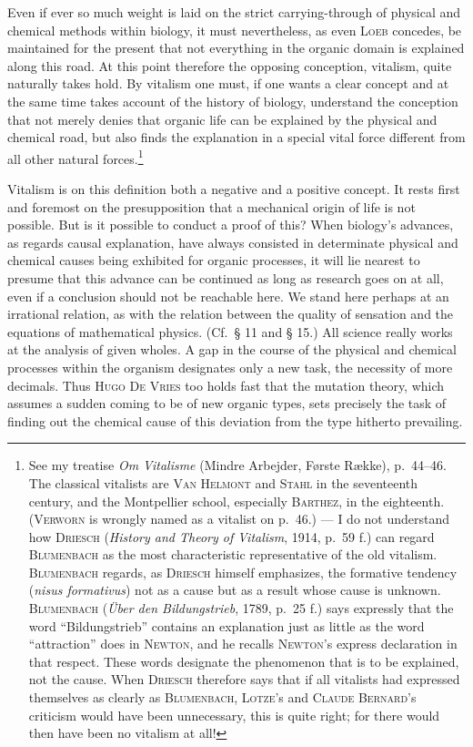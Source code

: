 \documentclass[12pt]{book}
\newcommand{\opage}[1]{\marginnote{\footnotesize\textit{[#1]}}}
\begin{document}
\opage{53}Even if ever so much weight is laid on the strict carrying-through of physical and
chemical methods within biology, it must nevertheless, as even \textsc{Loeb} concedes,
be maintained for the present that not everything in the organic domain is explained
along this road. At this point therefore the opposing conception, vitalism, quite
naturally takes hold. By vitalism one must, if one wants a clear concept and at the
same time takes account of the history of biology, understand the conception that not
merely denies that organic life can be explained by the physical and chemical road,
but also finds the explanation in a special vital force different from all other
natural forces.\footnote{See my treatise \textit{Om Vitalisme} (Mindre Arbejder,
Første Række), p.\ 44--46. The classical vitalists are \textsc{Van Helmont} and
\textsc{Stahl} in the seventeenth century, and the Montpellier school, especially
\textsc{Barthez}, in the eighteenth. (\textsc{Verworn} is wrongly named as a vitalist
on p.\ 46.) --- I do not understand how \textsc{Driesch} (\textit{History and Theory
of Vitalism}, 1914, p.\ 59 f.) can regard \textsc{Blumenbach} as the most
characteristic representative of the old vitalism. \textsc{Blumenbach} regards, as
\textsc{Driesch} himself emphasizes, the formative tendency (\textit{nisus
formativus}) not as a cause but as a result whose cause is unknown.
\textsc{Blumenbach} (\textit{Über den Bildungstrieb}, 1789, p.\ 25 f.) says expressly
that the word ``Bildungstrieb'' contains an explanation just as little as the word
``attraction'' does in \textsc{Newton}, and he recalls \textsc{Newton}'s express
declaration in that respect. These words designate the phenomenon that is to be
explained, not the cause. When \textsc{Driesch} therefore says that if all vitalists
had expressed themselves as clearly as \textsc{Blumenbach}, \textsc{Lotze}'s and
\textsc{Claude Bernard}'s criticism would have been unnecessary, this is quite right;
for there would then have been no vitalism at all!}

Vitalism is on this definition both a negative and a positive concept. It rests first
and foremost on the presupposition that a mechanical origin of life is not possible.
But is it possible to conduct a proof of this? When biology's advances, as regards
causal explanation, have always consisted in determinate physical and chemical causes
being exhibited for organic processes, it will lie nearest to presume that this
advance can be continued as long as research goes on at all, even if a conclusion
should not be reachable here. We stand here perhaps at an irrational relation, as with
the relation between the quality of sensation and the equations of mathematical
physics. (Cf.\ § 11 and § 15.) All science really works at the analysis of given
wholes. A gap in the course of the physical and chemical processes within the organism
designates only a new task, the necessity of more decimals. Thus \textsc{Hugo De
Vries} too holds fast that the mutation theory, which assumes a sudden coming to be of
new organic types, sets precisely the task of finding out the chemical cause of this
deviation from the type hitherto prevailing.
\end{document}
